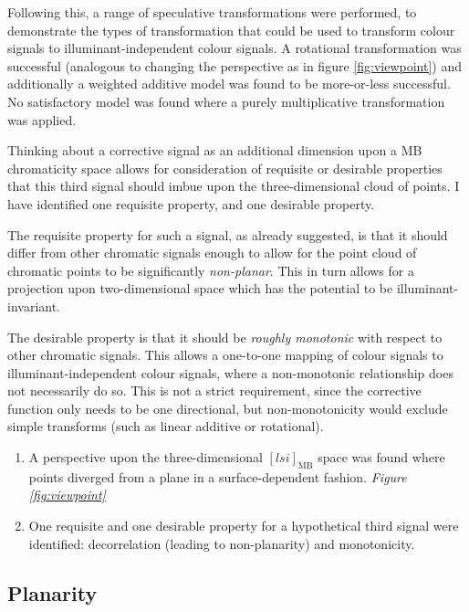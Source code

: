 Following this, a range of speculative transformations were performed, to demonstrate the types of transformation that could be used to transform colour signals to illuminant-independent colour signals. A rotational transformation was successful (analogous to changing the perspective as in figure \ref{fig:viewpoint}) and additionally a weighted additive model was found to be more-or-less successful. No satisfactory model was found where a purely multiplicative transformation was applied.

Thinking about a corrective signal as an additional dimension upon a \gls{MB} chromaticity space allows for consideration of requisite or desirable properties that this third signal should imbue upon the three-dimensional cloud of points. I have identified one requisite property, and one desirable property. 

The requisite property for such a signal, as already suggested, is that it should differ from other chromatic signals enough to allow for the point cloud of chromatic points to be significantly \emph{non-planar}. This in turn allows for a projection upon two-dimensional space which has the potential to be illuminant-invariant.

The desirable property is that it should be \emph{roughly monotonic} with respect to other chromatic signals. This allows a one-to-one mapping of colour signals to illuminant-independent colour signals, where a non-monotonic relationship does not necessarily do so. This is not a strict requirement, since the corrective function only needs to be one directional, but non-monotonicity would exclude simple transforms (such as linear additive or rotational).

\begin{enumerate}
    \item A perspective upon the three-dimensional $[lsi]_{\text{MB}}$ space was found where points diverged from a plane in a surface-dependent fashion. \emph{Figure \ref{fig:viewpoint}}
    \item One requisite and one desirable property for a hypothetical third signal were identified: decorrelation (leading to non-planarity) and monotonicity. 
\end{enumerate}



\subsection{Planarity}


